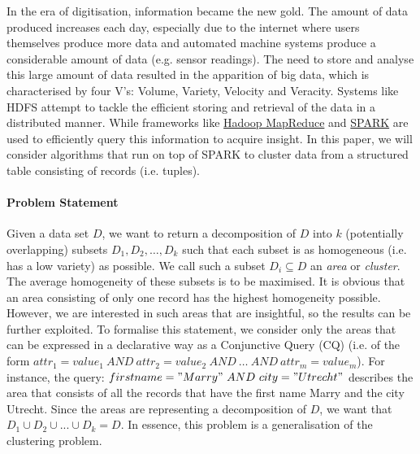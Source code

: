 In the era of digitisation, information became the new gold. The amount of data produced increases each day, especially due to the internet where users themselves produce more data and automated machine systems produce a considerable amount of data (e.g. sensor readings). The need to store and analyse this large amount of data resulted in the apparition of big data, which is characterised by four V's: Volume, Variety, Velocity and Veracity.
Systems like HDFS attempt to tackle the efficient storing and retrieval of the data in a distributed manner. While frameworks like \href{https://hadoop.apache.org/docs/stable/hadoop-mapreduce-client/hadoop-mapreduce-client-core/MapReduceTutorial.html}{Hadoop MapReduce} and \href{https://spark.apache.org/}{SPARK} are used to efficiently query this information to acquire insight. In this paper, we will consider algorithms that run on top of SPARK to cluster data from a structured table consisting of records (i.e. tuples).

\paragraph{Problem Statement}
Given a data set $D$, we want to return a decomposition of $D$ into $k$ (potentially overlapping) subsets $D_1, D_2, \dots , D_k$ such that each subset is as homogeneous (i.e. has a low variety) as possible. We call such a subset $D_i \subseteq D$ an \textit{area} or \textit{cluster}. The average homogeneity of these subsets is to be maximised. It is obvious that an area consisting of only one record has the highest homogeneity possible. However, we are interested in such areas that are insightful, so the results can be further exploited. To formalise this statement, we consider only the areas that can be expressed in a declarative way as a Conjunctive Query (CQ) (i.e. of the form $attr_1=value_1 \ AND \ attr_2=value_2 \ AND \ \dots \ AND \ attr_m=value_m$). For instance, the query: $firstname="Marry" \ AND \ city="Utrecht"$ describes the area that consists of all the records that have the first name Marry and the city Utrecht. Since the areas are representing a decomposition of $D$, we want that $D_1 \cup D_2 \cup ... \cup D_k = D$. In essence, this problem is a generalisation of the clustering problem.

